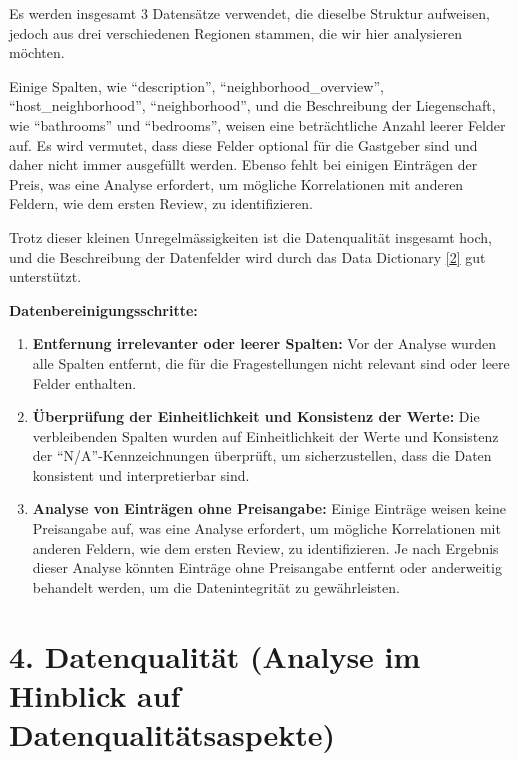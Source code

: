 \documentclass[
  journal,
]{IEEEtran}%
\begin{document}
Es werden insgesamt 3 Datensätze verwendet, die dieselbe Struktur
aufweisen, jedoch aus drei verschiedenen Regionen stammen, die wir hier
analysieren möchten.

Einige Spalten, wie ``description'', ``neighborhood\_overview'',
``host\_neighborhood'', ``neighborhood'', und die Beschreibung der
Liegenschaft, wie ``bathrooms'' und ``bedrooms'', weisen eine
beträchtliche Anzahl leerer Felder auf. Es wird vermutet, dass diese
Felder optional für die Gastgeber sind und daher nicht immer ausgefüllt
werden. Ebenso fehlt bei einigen Einträgen der Preis, was eine Analyse
erfordert, um mögliche Korrelationen mit anderen Feldern, wie dem ersten
Review, zu identifizieren.

Trotz dieser kleinen Unregelmässigkeiten ist die Datenqualität insgesamt
hoch, und die Beschreibung der Datenfelder wird durch das Data
Dictionary \protect\hyperlink{ref-inside-airbnb-2022}{{[}2{]}} gut
unterstützt.

\textbf{Datenbereinigungsschritte:}

\begin{enumerate}
\def\labelenumi{\arabic{enumi}.}
\item
  \textbf{Entfernung irrelevanter oder leerer Spalten:} Vor der Analyse
  wurden alle Spalten entfernt, die für die Fragestellungen nicht
  relevant sind oder leere Felder enthalten.
\item
  \textbf{Überprüfung der Einheitlichkeit und Konsistenz der Werte:} Die
  verbleibenden Spalten wurden auf Einheitlichkeit der Werte und
  Konsistenz der ``N/A''-Kennzeichnungen überprüft, um sicherzustellen,
  dass die Daten konsistent und interpretierbar sind.
\item
  \textbf{Analyse von Einträgen ohne Preisangabe:} Einige Einträge
  weisen keine Preisangabe auf, was eine Analyse erfordert, um mögliche
  Korrelationen mit anderen Feldern, wie dem ersten Review, zu
  identifizieren. Je nach Ergebnis dieser Analyse könnten Einträge ohne
  Preisangabe entfernt oder anderweitig behandelt werden, um die
  Datenintegrität zu gewährleisten.
\end{enumerate}

\hypertarget{datenqualituxe4t-analyse-im-hinblick-auf-datenqualituxe4tsaspekte}{%
\section{4. Datenqualität (Analyse im Hinblick auf
Datenqualitätsaspekte)}\label{datenqualituxe4t-analyse-im-hinblick-auf-datenqualituxe4tsaspekte}}
\end{document}
